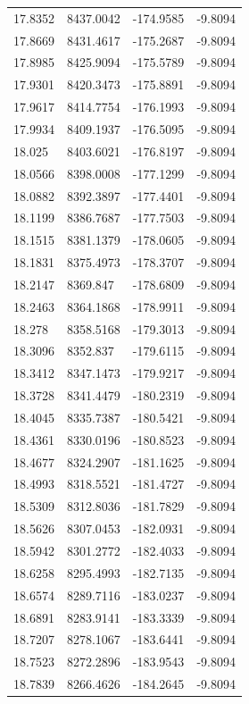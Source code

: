 \begin{table}[H]
\begin{tabular}{llll}
17.8352 & 8437.0042 & -174.9585 & -9.8094 \\
17.8669 & 8431.4617 & -175.2687 & -9.8094 \\
17.8985 & 8425.9094 & -175.5789 & -9.8094 \\
17.9301 & 8420.3473 & -175.8891 & -9.8094 \\
17.9617 & 8414.7754 & -176.1993 & -9.8094 \\
17.9934 & 8409.1937 & -176.5095 & -9.8094 \\
18.025 & 8403.6021 & -176.8197 & -9.8094 \\
18.0566 & 8398.0008 & -177.1299 & -9.8094 \\
18.0882 & 8392.3897 & -177.4401 & -9.8094 \\
18.1199 & 8386.7687 & -177.7503 & -9.8094 \\
18.1515 & 8381.1379 & -178.0605 & -9.8094 \\
18.1831 & 8375.4973 & -178.3707 & -9.8094 \\
18.2147 & 8369.847 & -178.6809 & -9.8094 \\
18.2463 & 8364.1868 & -178.9911 & -9.8094 \\
18.278 & 8358.5168 & -179.3013 & -9.8094 \\
18.3096 & 8352.837 & -179.6115 & -9.8094 \\
18.3412 & 8347.1473 & -179.9217 & -9.8094 \\
18.3728 & 8341.4479 & -180.2319 & -9.8094 \\
18.4045 & 8335.7387 & -180.5421 & -9.8094 \\
18.4361 & 8330.0196 & -180.8523 & -9.8094 \\
18.4677 & 8324.2907 & -181.1625 & -9.8094 \\
18.4993 & 8318.5521 & -181.4727 & -9.8094 \\
18.5309 & 8312.8036 & -181.7829 & -9.8094 \\
18.5626 & 8307.0453 & -182.0931 & -9.8094 \\
18.5942 & 8301.2772 & -182.4033 & -9.8094 \\
18.6258 & 8295.4993 & -182.7135 & -9.8094 \\
18.6574 & 8289.7116 & -183.0237 & -9.8094 \\
18.6891 & 8283.9141 & -183.3339 & -9.8094 \\
18.7207 & 8278.1067 & -183.6441 & -9.8094 \\
18.7523 & 8272.2896 & -183.9543 & -9.8094 \\
18.7839 & 8266.4626 & -184.2645 & -9.8094 \\

\end{tabular}
\end{table}
